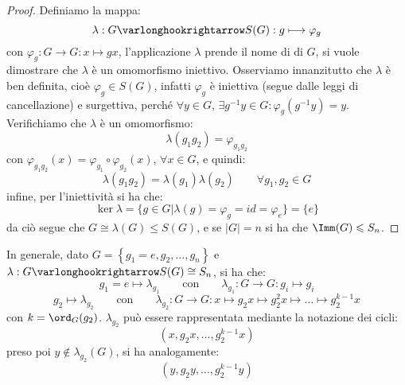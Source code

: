 \documentclass[11pt]{scrartcl}
\begin{document}
\begin{proof}
    Definiamo la mappa:
        \[ \lambda : G \varlonghookrightarrow S(G) : g \longmapsto \varphi_g
            \]
    con $\varphi_g : G \longrightarrow G : x \longmapsto gx$, l'applicazione $\lambda$ prende il nome di  di $G$, si 
    vuole dimostrare che $\lambda$ è un omomorfismo iniettivo.
    Osserviamo innanzitutto che $\lambda$ è ben definita, cioè $\varphi_g \in S(G)$, infatti $\varphi_g$ è iniettiva (segue dalle leggi di cancellazione) e 
    surgettiva, perché $\forall y \in G$, $\exists g^{-1}y \in G : \varphi_g(g^{-1}y) = y$. Verifichiamo che $\lambda$ è un omomorfismo:
        \[ \lambda(g_1g_2) = \varphi_{g_1g_2}
            \]
    con $\varphi_{g_1g_2} (x) = \varphi_{g_1} \circ \varphi_{g_2} (x)$, $\forall x \in G$, e quindi:
        \[ \lambda(g_1g_2) = \lambda(g_1) \lambda(g_2)
        \qquad \forall g_1,g_2 \in G
            \]
    infine, per l'iniettività si ha che:
        \[ \ker \lambda = \{g \in G | \lambda(g) = \varphi_g = id = \varphi_e\} = \{e\}
            \]
    da ciò segue che $G \cong \lambda(G) \leqslant S(G)$, e se $|G| = n$ si ha che $\Imm(G) \leqslant S_n$.
\end{proof}

\begin{remark}
    In generale, dato $G = \left\{g_1 = e,g_2, \ldots, g_n\right\}$ e $\lambda : G \varlonghookrightarrow S(G) \cong S_n$, si ha che:
        \[ g_1 = e \longmapsto \lambda_{g_1} \qquad \text{con} \qquad \lambda_{g_1}: G \longrightarrow G : g_i \longmapsto g_i
            \]
        \[ g_2 \longmapsto \lambda_{g_2} \qquad \text{con} \qquad \lambda_{g_2} : G \longrightarrow G : x \longmapsto g_2x \longmapsto g_2^2x \longmapsto \ldots \longmapsto g_2^{k-1}x
            \]
        con $k = \ord_G(g_2)$. $\lambda_{g_2}$ può essere rappresentata mediante la notazione dei cicli:
            \[ (x,g_2x,\ldots,g_2^{k-1}x)
                \]
        preso poi $y \not\in \lambda_{g_2}(G)$, si ha analogamente:
        \[ (y,g_2y,\ldots,g_2^{k-1}y)
            \]
\end{remark}
\end{document}
